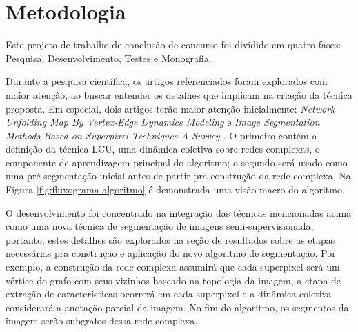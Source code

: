 \chapter{Metodologia}\label{cap:metodologia}


Este projeto de trabalho de conclusão de concurso foi dividido em quatro fases:
Pesquisa, Desenvolvimento, Testes e Monografia.

Durante a pesquisa científica, os artigos referenciados foram explorados com
maior atenção, ao buscar entender os detalhes que implicam
na criação da técnica proposta. Em especial, dois artigos terão maior
atenção inicialmente: \textit{Network Unfolding Map By Vertex-Edge
  Dynamics Modeling} \cite{VerriNetworkUnfoldingMap2018} e
\textit{Image Segmentation Methods Based on Superpixel Techniques A
  Survey} \cite{SuperpixelSurvey2020}. O primeiro contém a definição
da técnica LCU, uma dinâmica coletiva sobre redes complexas, o
componente de aprendizagem principal do algoritmo; o segundo será
usado como uma pré-segmentação inicial antes de partir pra construção
da rede complexa. Na Figura \ref{fig:fluxograma-algoritmo} é demonstrada uma
visão macro do algoritmo.

\begin{figure}[!h]
        \captionsetup{width=8cm}
		\centering
\end{figure}


O desenvolvimento foi concentrado na integração das técnicas
mencionadas acima como uma nova técnica de segmentação de imagens
semi-supervisionada, portanto, estes detalhes são explorados na seção
de resultados sobre as etapas necessárias pra construção e aplicação
do novo algoritmo de segmentação. Por exemplo, a construção da rede
complexa assumirá que cada superpixel será um vértice do grafo com
seus vizinhos baseado na topologia da imagem, a etapa de extração de
características ocorrerá em cada superpixel e a dinâmica coletiva
considerará a anotação parcial da imagem. No fim do algoritmo, os
segmentos da imagem serão subgrafos dessa rede complexa.

